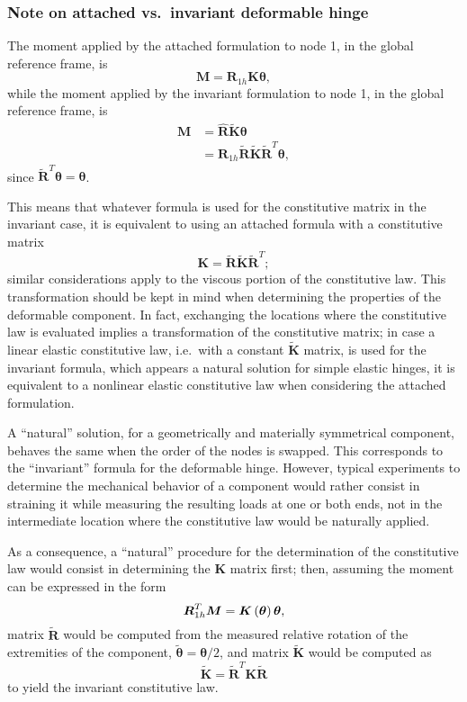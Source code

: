 \documentclass[10pt,dvips,fleqn]{report}
\newcommand{\T}[1]{\boldsymbol{#1}}
\begin{document}
\subsubsection{Note on attached vs.\ invariant deformable hinge}
The moment applied by the attached formulation to node 1,
in the global reference frame, is
\begin{equation}
	\T{M} = \T{R}_{1h} \T{K} \T{\theta} ,
\end{equation}
while the moment applied by the invariant formulation to node 1,
in the global reference frame, is
\begin{align}
	\T{M} &= \hat{\T{R}} \tilde{\T{K}} \T{\theta} \\
	&= \T{R}_{1h} \tilde{\T{R}} \tilde{\T{K}} \tilde{\T{R}}^T \T{\theta} ,
\end{align}
since $\tilde{\T{R}}^T \T{\theta}=\T{\theta}$.

This means that whatever formula is used for the constitutive matrix
in the invariant case, it is equivalent to using an attached formula 
with a constitutive matrix
\begin{equation}
	\T{K} = \tilde{\T{R}} \tilde{\T{K}} \tilde{\T{R}}^T ;
\end{equation}
similar considerations apply to the viscous portion of the constitutive law.
This transformation should be kept in mind when determining the properties
of the deformable component.
In fact, exchanging the locations where the constitutive law is evaluated
implies a transformation of the constitutive matrix; in case a linear elastic
constitutive law, i.e.\ with a constant $\tilde{\T{K}}$ matrix, is used
for the invariant formula, which appears a natural solution for simple 
elastic hinges, it is equivalent to a nonlinear elastic constitutive
law when considering the attached formulation.

A ``natural'' solution, for a geometrically and materially symmetrical
component, behaves the same when the order of the nodes is swapped.
This corresponds to the ``invariant'' formula for the deformable hinge.
However, typical experiments to determine the mechanical behavior
of a component would rather consist in straining it while measuring
the resulting loads at one or both ends, not in the intermediate
location where the constitutive law would be naturally applied.

As a consequence, a ``natural'' procedure for the determination
of the constitutive law would consist in determining the $\T{K}$
matrix first; then, assuming the moment can be expressed in the form
\begin{equation}
	\T{R}_{1h}^T \T{M} = \T{K}\plbr{\T{\theta}} \T{\theta} ,
\end{equation}
matrix $\tilde{\T{R}}$ would be computed
from the measured relative rotation of the extremities of the component,
$\tilde{\T{\theta}}=\T{\theta}/2$,
and matrix $\tilde{\T{K}}$ would be computed as
\begin{equation}
	\tilde{\T{K}} = \tilde{\T{R}}^T \T{K} \tilde{\T{R}}
\end{equation}
to yield the invariant constitutive law.
\end{document}

